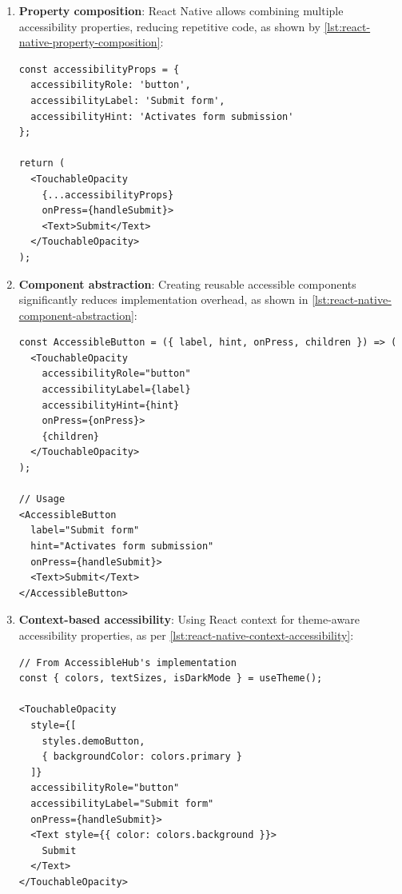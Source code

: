 \begin{enumerate}
    \item \textbf{Property composition}: React Native allows combining multiple accessibility properties, reducing repetitive code, as shown by \ref{lst:react-native-property-composition}:
    
    \begin{lstlisting}[style=ReactNativeStyle, caption=Property composition in React Native, label=lst:react-native-property-composition]
const accessibilityProps = {
  accessibilityRole: 'button',
  accessibilityLabel: 'Submit form',
  accessibilityHint: 'Activates form submission'
};

return (
  <TouchableOpacity
    {...accessibilityProps}
    onPress={handleSubmit}>
    <Text>Submit</Text>
  </TouchableOpacity>
);
    \end{lstlisting}
    
    \item \textbf{Component abstraction}: Creating reusable accessible components significantly reduces implementation overhead, as shown in \ref{lst:react-native-component-abstraction}:
    
    \begin{lstlisting}[style=ReactNativeStyle, caption=Component abstraction in React Native, label=lst:react-native-component-abstraction]
const AccessibleButton = ({ label, hint, onPress, children }) => (
  <TouchableOpacity
    accessibilityRole="button"
    accessibilityLabel={label}
    accessibilityHint={hint}
    onPress={onPress}>
    {children}
  </TouchableOpacity>
);

// Usage
<AccessibleButton
  label="Submit form"
  hint="Activates form submission"
  onPress={handleSubmit}>
  <Text>Submit</Text>
</AccessibleButton>
    \end{lstlisting}
    
    \item \textbf{Context-based accessibility}: Using React context for theme-aware accessibility properties, as per \ref{lst:react-native-context-accessibility}:
    
    \begin{lstlisting}[style=ReactNativeStyle, caption=Context-based accessibility in React Native, label=lst:react-native-context-accessibility]
// From AccessibleHub's implementation
const { colors, textSizes, isDarkMode } = useTheme();

<TouchableOpacity
  style={[
    styles.demoButton,
    { backgroundColor: colors.primary }
  ]}
  accessibilityRole="button"
  accessibilityLabel="Submit form"
  onPress={handleSubmit}>
  <Text style={{ color: colors.background }}>
    Submit
  </Text>
</TouchableOpacity>
    \end{lstlisting}
\end{enumerate}

